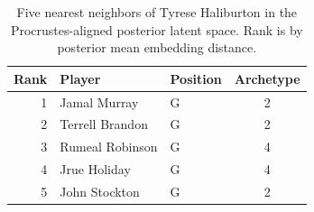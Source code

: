 \begin{table}[htbp]
  \centering\small
  \begin{tabular}{rllc}
    \toprule
    Rank & Player & Position & Archetype \\
    \midrule
    1 & Jamal Murray & G & 2 \\
    2 & Terrell Brandon & G & 2 \\
    3 & Rumeal Robinson & G & 4 \\
    4 & Jrue Holiday & G & 4 \\
    5 & John Stockton & G & 2 \\
    \bottomrule
  \end{tabular}
  \caption{Five nearest neighbors of Tyrese Haliburton in the Procrustes-aligned posterior latent space. Rank is by posterior mean embedding distance.}
  \label{tab:Tyrese_Haliburton_neighbors}
\end{table}

